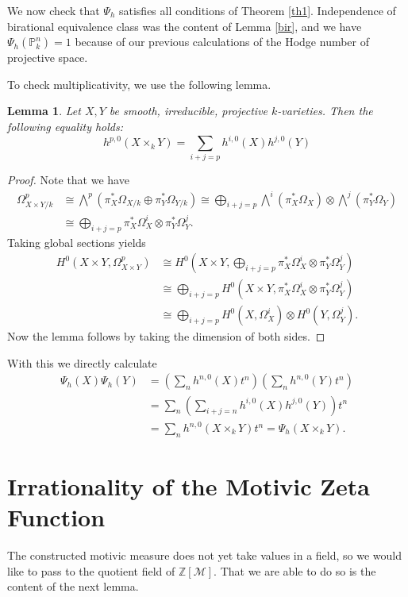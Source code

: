 \documentclass[11pt, a4paper, english, twoside]{article}
\theoremstyle{plain}
\newtheorem{lemma}[theorem]{Lemma}
\theoremstyle{definition}
\begin{document}
We now check that $\Psi_h$ satisfies all conditions of Theorem \ref{th1}. Independence of birational equivalence class was the content of Lemma
\ref{bir}, and we have $\Psi_h(\mathbb{P}_k^n) = 1$ because of our previous calculations of the Hodge number of projective space.

To check multiplicativity, we use the following lemma.

\begin{lemma}
    Let $X,Y$ be smooth, irreducible, projective $k$-varieties. Then the following equality holds:
    \[
        h^{p,0}(X \times_k Y) = \sum_{i+j=p} h^{i,0}(X)h^{j,0}(Y)
    \]
\end{lemma}
\begin{proof}
    Note that we have 
    \begin{align*}
        \Omega_{X \times Y / k}^p & \cong {\bigwedge}^p(\pi_X^*\Omega_{X/k} \oplus \pi_Y^* \Omega_{Y/k}) 
                                    \cong \bigoplus_{i+j = p} {\bigwedge}^i(\pi_X^*\Omega_X)  \otimes {\bigwedge}^j(\pi_Y^*\Omega_Y)\\
                                  & \cong \bigoplus_{i+j = p} \pi_X^*\Omega^i_X \otimes \pi_Y^*\Omega^j_Y.
    \end{align*}
    Taking global sections yields
    \begin{align*}
        H^0(X \times Y, \Omega_{X \times Y}^p) &\cong H^0(X \times Y, \bigoplus_{i+j = p} \pi_X^*\Omega^i_X \otimes \pi_Y^*\Omega^j_Y)\\
        &\cong \bigoplus_{i+j = p} H^0(X \times Y, \pi_X^*\Omega^i_X \otimes \pi_Y^*\Omega^j_Y) \\
        & \cong \bigoplus_{i+j = p} H^0(X, \Omega^i_X) \otimes H^0(Y, \Omega^j_Y).
    \end{align*}
    Now the lemma follows by taking the dimension of both sides.
\end{proof}
With this we directly calculate 
\begin{align*}
    \Psi_h(X)\Psi_h(Y) &= \left( \sum_n h^{n,0}(X)t^n \right) \left( \sum_n h^{n,0}(Y)t^n \right) \\
    &= \sum_n \left( \sum_{i+j=n} h^{i,0}(X) h^{j,0}(Y) \right )t^n \\ &= \sum_n h^{n,0}(X \times_k Y)t^n = \Psi_h(X \times_k Y).
\end{align*}


\section{Irrationality of the Motivic Zeta Function}
\label{final}
The constructed motivic measure does not yet take values in a field, so we would like to pass to the quotient field of $\mathbb{Z}[\mathcal{M}]$.
That we are able to do so is the content of the next lemma.
\end{document}
